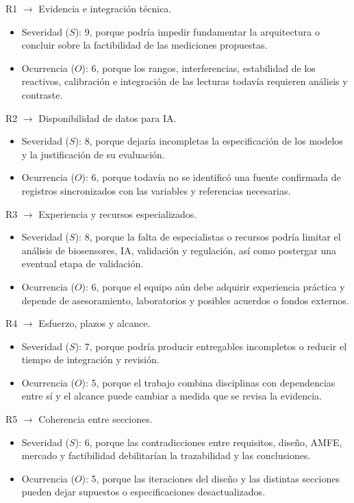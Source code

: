 \noindent R1 $\rightarrow$ Evidencia e integración técnica.
\begin{itemize}
    \item Severidad ($S$): 9, porque podría impedir fundamentar la arquitectura o concluir sobre la factibilidad de las mediciones propuestas.
    \item Ocurrencia ($O$): 6, porque los rangos, interferencias, estabilidad de los reactivos, calibración e integración de las lecturas todavía requieren análisis y contraste.
\end{itemize}

\noindent R2 $\rightarrow$ Disponibilidad de datos para IA.
\begin{itemize}
    \item Severidad ($S$): 8, porque dejaría incompletas la especificación de los modelos y la justificación de su evaluación.
    \item Ocurrencia ($O$): 6, porque todavía no se identificó una fuente confirmada de registros sincronizados con las variables y referencias necesarias.
\end{itemize}

\noindent R3 $\rightarrow$ Experiencia y recursos especializados.
\begin{itemize}
    \item Severidad ($S$): 8, porque la falta de especialistas o recursos podría limitar el análisis de biosensores, IA, validación y regulación, así como postergar una eventual etapa de validación.
    \item Ocurrencia ($O$): 6, porque el equipo aún debe adquirir experiencia práctica y depende de asesoramiento, laboratorios y posibles acuerdos o fondos externos.
\end{itemize}

\noindent R4 $\rightarrow$ Esfuerzo, plazos y alcance.
\begin{itemize}
    \item Severidad ($S$): 7, porque podría producir entregables incompletos o reducir el tiempo de integración y revisión.
    \item Ocurrencia ($O$): 5, porque el trabajo combina disciplinas con dependencias entre sí y el alcance puede cambiar a medida que se revisa la evidencia.
\end{itemize}

\noindent R5 $\rightarrow$ Coherencia entre secciones.
\begin{itemize}
    \item Severidad ($S$): 6, porque las contradicciones entre requisitos, diseño, AMFE, mercado y factibilidad debilitarían la trazabilidad y las conclusiones.
    \item Ocurrencia ($O$): 5, porque las iteraciones del diseño y las distintas secciones pueden dejar supuestos o especificaciones desactualizados.
\end{itemize}

